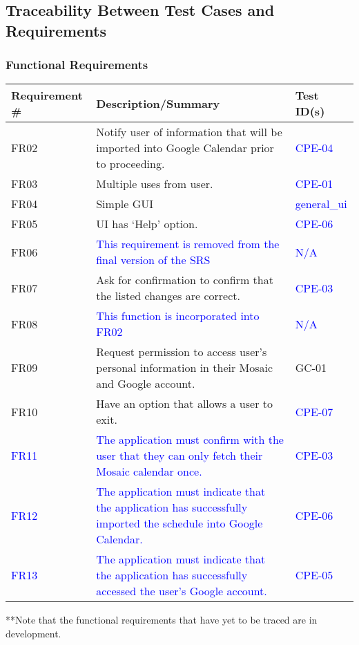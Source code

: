 \documentclass[12pt, titlepage]{article}
\begin{document}
\subsection{Traceability Between Test Cases and Requirements}

\subsubsection{Functional Requirements}
\begin{tabular}{ |p{3cm}|p{8cm}|p{2cm}| }
\hline Requirement \#  &Description/Summary& Test ID(s) \\
\toprule
FR02 & Notify user of information that will be imported into Google Calendar prior to proceeding. & \textcolor{blue}{CPE-04}\\
FR03 & Multiple uses from user. &\textcolor{blue}{CPE-01}\\
FR04 & Simple GUI & \textcolor{blue}{general\_ui}\\
FR05 & UI has ‘Help’ option. & \textcolor{blue}{CPE-06}\\
FR06 & \textcolor{blue}{This requirement is removed from the final version of the SRS} & \textcolor{blue}{N/A}\\
FR07 & Ask for confirmation to confirm that the listed changes are correct. & \textcolor{blue}{CPE-03}\\
FR08 & \textcolor{blue}{This function is incorporated into FR02} & \textcolor{blue}{N/A}\\
FR09 & Request permission to access user’s personal information in their Mosaic and Google account. & GC-01\\
FR10 & Have an option that allows a user to exit. &  \textcolor{blue}{CPE-07}\\
\textcolor{blue}{FR11} & \textcolor{blue}{The application must confirm with the user that they can only fetch their Mosaic calendar once.} & \textcolor{blue}{CPE-03}\\
\textcolor{blue}{FR12}& \textcolor{blue}{The application must indicate that the application has successfully imported the schedule into Google Calendar.} & \textcolor{blue}{CPE-06}\\
\textcolor{blue}{FR13} & \textcolor{blue}{The application must indicate that the application has successfully accessed the user's Google account.} & \textcolor{blue}{CPE-05}\\
\bottomrule
\end{tabular}
\caption{**Note that the functional requirements that have yet to be traced are in development.}
\end{document}
